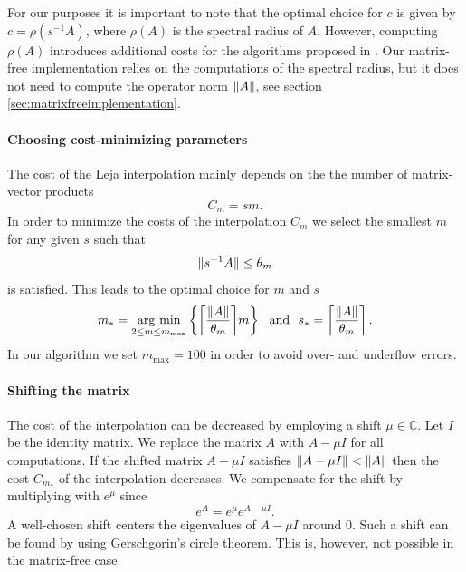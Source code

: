 \documentclass{scrartcl}
\begin{document}
	For our purposes it is important to note that the optimal choice for $c$ is given by $c=\rho(s^{-1}A)$, where $\rho(A)$ is the spectral radius of $A$. However, computing $\rho(A)$ introduces additional costs for the algorithms proposed in \cite{lejarev}. Our matrix-free implementation relies on the computations of the spectral radius, but it does not need to compute the operator norm $\lVert A\rVert$, see section \ref{sec:matrixfreeimplementation}.
	
	\paragraph{Choosing cost-minimizing parameters}
	The cost of the Leja interpolation mainly depends on the the number of matrix-vector products
	\[
	C_{m} = sm. 
	\]
	In order to minimize the costs of the interpolation $C_m$ we select the smallest $m$ for any given $s$ such that
	\[
	\lVert s^{-1}A\rVert \le \theta_m
	\]
	is satisfied. This leads to the optimal choice for $m$ and $s$ 
	\begin{align}
	\begin{split}
	m_* = \underset{2\le m\le m_{\operatorname{max}}}{\operatorname{arg\ min}}  \left\{{\left\lceil{\frac{\norm{A}}{\theta_m}}\right\rceil}m\right\} ~~\text{and}~~
	s_* =  \left\lceil{\frac{\norm{A}}{\theta_m}}\right\rceil.
	\end{split} \label{eq:ms}
	\end{align}
	In our algorithm we set $m_{\operatorname{max}} = 100$ in order to avoid over- and underflow errors.
	
	\paragraph{Shifting the matrix}
	The cost of the interpolation can be decreased by employing a shift $\mu\in\mathbb{C}$. Let $I$ be the identity matrix. We replace the matrix $A$ with $A-\mu I$ for all computations. If the shifted matrix $A-\mu I$ satisfies $\lVert A -\mu I\rVert < \lVert A\rVert$ then the cost $C_{m_*}$ of the interpolation decreases.
	We compensate for the shift by multiplying with $e^\mu$ since
	\[
	e^{A} = e^{\mu}e^{A-\mu I}.
	\]
	A well-chosen shift centers the eigenvalues of $A-\mu I$ around $0$. Such a shift can be found by using Gerschgorin's circle theorem. This is, however, not possible in the matrix-free case.
	
\end{document}
